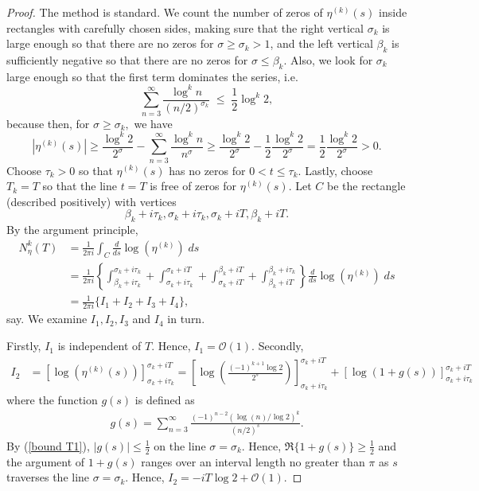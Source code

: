 \documentclass{amsart}
\theoremstyle{plain}
\theoremstyle{definition}
\newcommand{\etak}{\eta^{(k)}}
\begin{document}
\begin{proof}
    The method is standard. We count the number of zeros of  $\eta^{(k)}(s)$ inside rectangles with carefully chosen sides, making sure that  the right vertical $\sigma_{k}$ is large enough so that there are no zeros for $\sigma \geq \sigma_{k}>1$, and the left vertical  $\beta_{k}$ is sufficiently negative so that there are no zeros for $\sigma\leq \beta_{k}$. Also, we look for $\sigma_{k}$ large enough so that the first term dominates the series, i.e. 
    \begin{equation}\label{bound T1}
        \sum_{n=3}^{\infty}\frac{\log^{k} n}{(n/2)^{\sigma_{k}}} \; \leq \; \frac{1}{2}\log^{k} 2, 
    \end{equation}
    because then, for $\sigma \geq \sigma_{k}, $ we have 
\begin{equation}\label{eta left frac}
        |\eta^{(k)}(s)|\geq\frac{\log^{k} 2}{2^{\sigma}}-\sum_{n=3}^{\infty}\frac{\log^{k} n}{n^{\sigma}}\geq\frac{\log^{k} 2}{2^{\sigma}}-\frac{1}{2}\frac{\log^{k} 2}{2^{\sigma}}=\frac{1}{2}\frac{\log^{k} 2}{2^\sigma}>0. 
\end{equation}
Choose $\tau_{k}>0$ so that $\eta^{(k)}(s)$ has no zeros for $0<t\leq \tau_{k}.$ Lastly, choose $T_{k}=T$ so that the line $t=T$ is free of zeros for $\eta^{(k)}(s)$. Let $C$ be the rectangle (described positively) with vertices
\[\beta_{k}+i\tau_{k}, \sigma_{k}+i\tau_{k}, \sigma_{k}+iT, \beta_{k}+iT.\]
By the argument principle, 
\begin{align*}
    N_{\eta}^{k}(T) &= \frac{1}{2\pi i}\int_C \frac{d}{ds}\log(\etak) \; ds\\
    &=\frac{1}{2\pi i}\left\{\int_{\beta_{k}+i\tau_{k}}^{\sigma_{k}+i\tau_{k}}+\int_{\sigma_{k}+i\tau_{k}}^{\sigma_{k}+iT}+\int_{\sigma_{k}+iT}^{\beta_{k}+iT}+\int_{\beta_{k}+iT}^{\beta_{k}+i\tau_{k}}\right\}\frac{d}{ds}\log(\etak) \; ds\\
    &=\frac{1}{2\pi i}\{I_1+I_2+I_3+I_4\},
\end{align*}
say. We examine $I_1,I_2,I_3$ and $I_4$ in turn. 

Firstly, $I_1$ is independent of $T.$ Hence, $I_1=\mathcal{O}(1)$.
Secondly, 
\begin{align*}
    I_2&=\left[\log(\eta^{(k)}(s))\right]_{\sigma_{k}+i\tau_{k}}^{\sigma_{k}+iT} = \left[\log\left(\frac{(-1)^{k+1}\log 2}{2^s}\right)\right]_{\sigma_{k}+i\tau_{k}}^{\sigma_{k}+iT}+\left[\log(1+g(s))\right]_{\sigma_{k}+i\tau_{k}}^{\sigma_{k}+iT}
\end{align*}
where the function $g(s)$ is defined as 
\begin{align*}
    g(s)=\sum_{n=3}^{\infty}\frac{(-1)^{n-2}(\log(n)/\log 2)^{k}}{(n/2)^s}.
\end{align*}
By (\ref{bound T1}), $|g(s)|\leq \frac{1}{2}$ on the line $\sigma=\sigma_{k}$. Hence, $\Re\{1+g(s)\}\geq \frac{1}{2}$ and the argument of $1+g(s)$ ranges over an interval length no greater than $\pi$ as $s$ traverses the line $\sigma=\sigma_{k}.$ Hence, 
\(I_2 =-iT\log 2+\mathcal{O}(1)\).


\end{proof}
\end{document}
